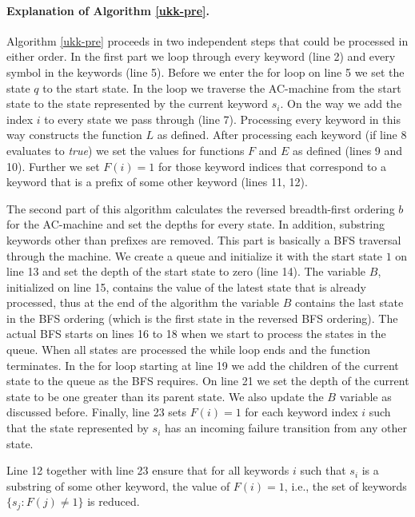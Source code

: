 \documentclass[english,twoside,censored,csm,algorithms-track-2020]{HYthesisML}
\theoremstyle{plain}
\theoremstyle{definition}
\numberwithin{testexample}{chapter}
\begin{document}
\paragraph{Explanation of Algorithm \ref{ukk-pre}.}  
Algorithm \ref{ukk-pre} proceeds in two independent steps that could be processed in either order.
In the first part we loop through every keyword (line 2) and every symbol in the keywords (line 5).
Before we enter the for loop on line 5 we set the state $q$ to the start state. In the loop
we traverse the AC-machine from the start state to the state represented by the current keyword $s_i$.
On the way we add the index $i$ to every state we pass through (line 7). Processing every keyword in this
way constructs the function $L$ as defined. After processing each keyword (if line 8 evaluates to
\textit{true}) we set the values for functions $F$ and $E$ as defined (lines 9 and 10).
Further we set $F(i) = 1$ for those keyword indices that correspond to a keyword that is a prefix
of some other keyword (lines 11, 12).

The second part of this algorithm calculates the reversed breadth-first ordering $b$ for the
AC-machine and set the depths for every state.
In addition, substring keywords other than
prefixes are removed. This part is basically a BFS traversal through the machine. We create a queue
and initialize it with the start state $1$ on line 13 and set the depth of the start state to
zero (line 14). The variable $B$, initialized on line 15, contains the value of the latest state
that is already processed, thus at the end of the algorithm the variable $B$ contains the last state
in the BFS ordering (which is the first state in the reversed BFS ordering). The actual BFS starts
on lines 16 to 18 when we start to process the states in the queue. When all states are processed
the while loop ends and the function terminates. In the for loop starting at line 19 we add the
children of the current state to the queue as the BFS requires. On line 21 we set the depth
of the current state to be one greater than its parent state. We also update the $B$ variable
as discussed before. Finally, line 23 sets $F(i) = 1$ for each keyword index $i$ such that
the state represented by $s_i$ has an incoming failure transition from any other state.
  

Line 12 together with line 23 ensure that for all keywords $i$ such that $s_i$ is a substring
of some other keyword, the value of $F(i)=1$, i.e., the set of keywords $\{s_j : F(j) \neq 1\}$ is
reduced.
\end{document}
